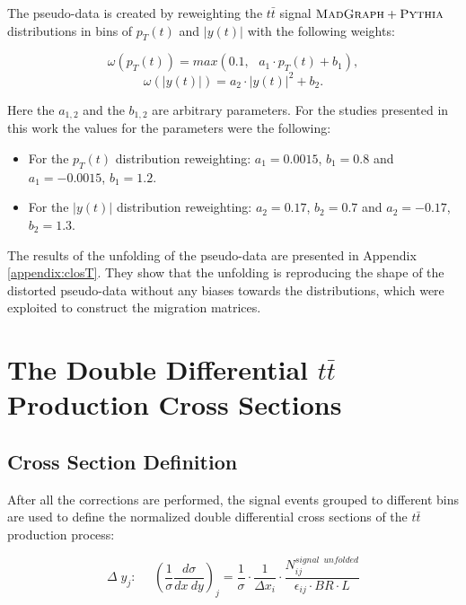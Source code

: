 The pseudo-data is created by reweighting the $t\bar{t}$ signal $\textsc{MadGraph}+\textsc{Pythia}$ distributions in bins of $p_{T}(t)$ and $|y(t)|$ with the following
weights:

\begin{equation}\label{eq:clTw1}
 \omega(p_{T}(t)) = max(0.1,\:\:\:a_{1} \cdot p_{T}(t) + b_{1}),
\end{equation}
\begin{equation}\label{eq:clTw2}
 \omega(|y(t)|) = a_{2} \cdot |y(t)|^{2} + b_{2}.
\end{equation}

Here the $a_{1,2}$ and the $b_{1,2}$ are arbitrary parameters. For the studies presented in this work the values for the parameters were the 
following: 
\begin{itemize}
 \item For the $p_{T}(t)$ distribution reweighting: $a_{1} = 0.0015$, $b_{1} = 0.8$ and $a_{1} = -0.0015$, $b_{1} = 1.2$. 
 \item For the $|y(t)|$ distribution reweighting: $a_{2} = 0.17$, $b_{2} = 0.7$ and $a_{2} = -0.17$, $b_{2} = 1.3$.
\end{itemize}

The results of the unfolding of the pseudo-data are presented in Appendix \ref{appendix:closT}. They show that the unfolding is reproducing
the shape of the distorted pseudo-data without any biases towards the distributions, which were exploited to construct the migration matrices.

\section{The Double Differential $t\bar{t}$ Production Cross Sections}

\subsection{Cross Section Definition}\label{ssec:xsec_def}

After all the corrections are performed, the signal events grouped to different bins are used to define the normalized double differential cross sections
of the $t\bar{t}$ production process:

\begin{equation}\label{eq:ddxsecdef}
 \Delta\;y_{j}: \:\:\:\:\:\:(\frac{1}{\sigma} \frac{d\sigma}{dx\:dy})_{j} = \frac{1}{\sigma} \cdot \frac{1}{\Delta x_{i}} \cdot \frac{N^{signal\:\;unfolded}_{ij}}{\epsilon_{ij} \cdot BR \cdot L}
\end{equation}

